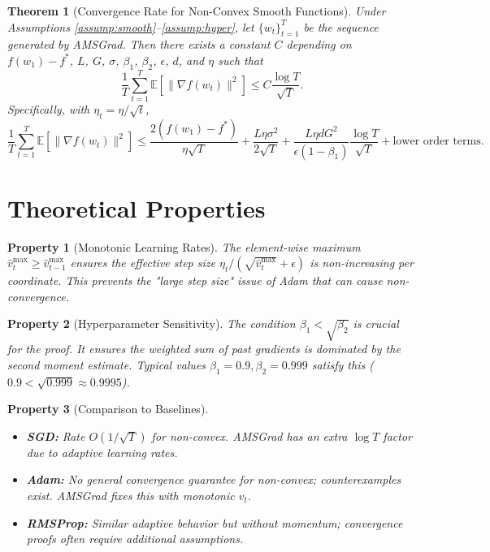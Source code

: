 \documentclass{article}
\newtheorem{theorem}{Theorem}
\newtheorem{property}{Property}
\begin{document}
\begin{theorem}[Convergence Rate for Non-Convex Smooth Functions] \label{thm:main}
Under Assumptions \ref{assump:smooth}--\ref{assump:hyper}, let $\{w_t\}_{t=1}^T$ be the sequence generated by AMSGrad. Then there exists a constant $C$ depending on $f(w_1) - f^*$, $L$, $G$, $\sigma$, $\beta_1$, $\beta_2$, $\epsilon$, $d$, and $\eta$ such that
\begin{equation}
    \frac{1}{T} \sum_{t=1}^T \mathbb{E}[\|\nabla f(w_t)\|^2] \le C \frac{\log T}{\sqrt{T}}.
\end{equation}
Specifically, with $\eta_t = \eta / \sqrt{t}$,
\begin{equation}
    \frac{1}{T} \sum_{t=1}^T \mathbb{E}[\|\nabla f(w_t)\|^2] \le \frac{2(f(w_1) - f^*)}{\eta \sqrt{T}} + \frac{L \eta \sigma^2}{2\sqrt{T}} + \frac{L \eta d G^2}{\epsilon (1-\beta_1)} \frac{\log T}{\sqrt{T}} + \text{lower order terms}.
\end{equation}
\end{theorem}

\section*{Theoretical Properties}

\begin{property}[Monotonic Learning Rates]
The element-wise maximum $\hat{v}_t^{\text{max}} \ge \hat{v}_{t-1}^{\text{max}}$ ensures the effective step size $\eta_t / (\sqrt{\hat{v}_t^{\text{max}}} + \epsilon)$ is non-increasing per coordinate. This prevents the "large step size" issue of Adam that can cause non-convergence.
\end{property}

\begin{property}[Hyperparameter Sensitivity]
The condition $\beta_1 < \sqrt{\beta_2}$ is crucial for the proof. It ensures the weighted sum of past gradients is dominated by the second moment estimate. Typical values $\beta_1=0.9, \beta_2=0.999$ satisfy this ($0.9 < \sqrt{0.999} \approx 0.9995$).
\end{property}

\begin{property}[Comparison to Baselines]
\begin{itemize}
    \item \textbf{SGD:} Rate $O(1/\sqrt{T})$ for non-convex. AMSGrad has an extra $\log T$ factor due to adaptive learning rates.
    \item \textbf{Adam:} No general convergence guarantee for non-convex; counterexamples exist. AMSGrad fixes this with monotonic $v_t$.
    \item \textbf{RMSProp:} Similar adaptive behavior but without momentum; convergence proofs often require additional assumptions.
\end{itemize}
\end{property}
\end{document}
